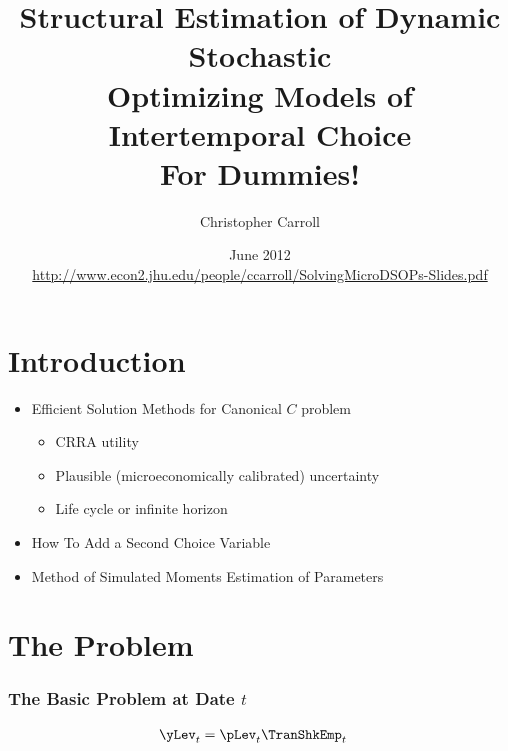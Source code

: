 \documentclass{beamer}
\begin{document}

\title[SolvingMicroDSOPs]{\textbf{Structural Estimation of Dynamic Stochastic\\ Optimizing Models of Intertemporal Choice \\ \LARGE{For Dummies!}}}
\author[Carroll]{Christopher Carroll}

\date{June 2012 \\ {\tiny \url{http://www.econ2.jhu.edu/people/ccarroll/SolvingMicroDSOPs-Slides.pdf}}
}


\begin{frame}[plain]
  \titlepage
\end{frame}

\section{Introduction}

\begin{frame}
\begin{itemize}
\item Efficient Solution Methods for Canonical $C$ problem
\begin{itemize}
\item CRRA utility
\item Plausible (microeconomically calibrated) uncertainty
\item Life cycle or infinite horizon
\end{itemize}
\item How To Add a Second Choice Variable
\item Method of Simulated Moments Estimation of Parameters
\end{itemize}
\end{frame}

\section{The Problem}

\begin{frame}[label=MaxProb]
\frametitle{\large\textbf{The Basic Problem at Date $t$}}


\begin{equation}\begin{gathered}\begin{aligned}
{\yLev}_{t}  & = {\pLev}_{t}\TranShkEmp_{t}
\end{aligned}\end{gathered}\end{equation}

\end{frame}
\end{document}
